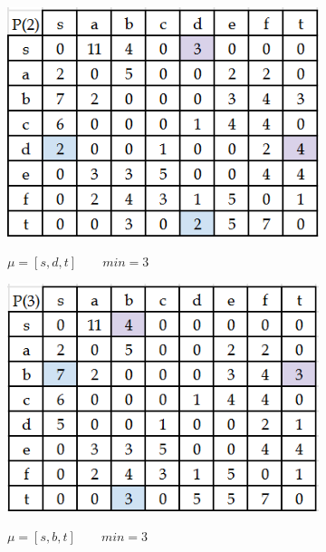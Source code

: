 \documentclass{article}
\begin{document}
\begin{enumerate}
\begin{figure}
\begin{subfigure}[t]{0.3\textwidth}
         \label{fig:16_1}
     \end{subfigure}
     \hfill
     \begin{subfigure}[t]{0.3\textwidth}
         \centering
         \caption*{\small{$\mu = [s, d, t]\qquad min = 3$}}
         \includegraphics[width=\textwidth]{attachments/16/2.png}
         \label{fig:16_2}
     \end{subfigure}
     \hfill
     \begin{subfigure}[t]{0.3\textwidth}
         \centering
         \caption*{\small{$\mu = [s, b, t]\qquad min = 3$}}
         \includegraphics[width=\textwidth]{attachments/16/3.png}
         \label{fig:16_3}
     \end{subfigure}
     \hfill
     \begin{subfigure}[b]{0.3\textwidth}

\end{subfigure}
\end{figure}
\end{enumerate}
\end{document}
